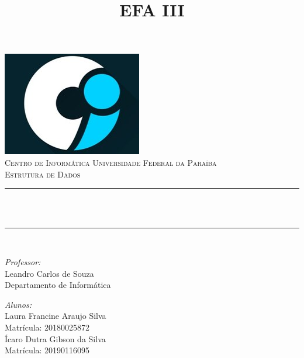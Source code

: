 \documentclass[11pt]{article} %
\title{EFA III}
\makeatletter
\let\thetitle\@title
\let\thedate\@date
\makeatother
\begin{document}
\begin{titlepage}
	\centering
    \vspace{2cm}
    \includegraphics[scale = 0.6]{logo-ci.jpeg}\\[0.1 cm]	%
    \textsc{\LARGE \newline\newline Centro de Informática \newline\newline Universidade Federal da Paraíba}\\[2.0 cm]	%
	\textsc{\Large Estrutura de Dados}\\[0.5 cm]				%
	\rule{\linewidth}{0.2 mm} \\[0.4 cm]
	{ \huge \bfseries \thetitle}\\
	\rule{\linewidth}{0.2 mm} \\[1.5 cm]

	\begin{minipage}{0.5\textwidth}
		\begin{flushleft} \large
			\emph{Professor:}\\
			Leandro Carlos de Souza\\
            Departamento de Informática\\
			\end{flushleft}
			\end{minipage}
			\begin{minipage}{0.4\textwidth}
            
			\begin{flushright} \large
			\emph{Alunos:} \\
		Laura Francine Araujo Silva \\
		Matrícula: 20180025872\\
		Ícaro Dutra Gibson da Silva\\
		Matrícula: 20190116095\\
		\end{flushright}
        
	\end{minipage}\\[2 cm]

	\thedate \\[1 cm]

\end{titlepage}
\end{document}
